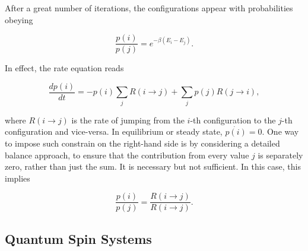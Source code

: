 \documentclass{homework}
\begin{document}
After a great number of iterations, the configurations appear with probabilities obeying 

$$
    \frac{p(i)}{p(j)} = e^{-\beta (E_i - E_j)}.
$$

In effect, the rate equation reads 

\begin{equation*}
    \frac{dp(i)}{dt} = -p(i) \sum_{j} R(i\rightarrow j) + \sum_{j} p(j) R(j\rightarrow i),
\end{equation*}

where $R(i\rightarrow j)$ is the rate of jumping from the $i$-th configuration to the $j$-th configuration and vice-versa. In equilibrium or steady state, $\dot{p(i)} = 0$. One way to impose such constrain on the right-hand side is by considering a detailed balance approach, to ensure that the contribution from every value $j$ is separately zero, rather than just the sum. It is necessary but not sufficient. In this case, this implies 

\begin{equation}
    \frac{p(i)}{p(j)} = \frac{R(i\rightarrow j)}{R(i\rightarrow j)}.
\end{equation}

\clearpage

\subsection{Quantum Spin Systems}



\end{document}
